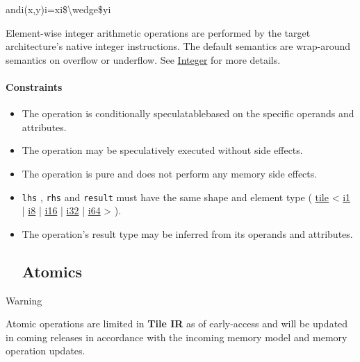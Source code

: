 \documentclass{article}
\begin{document}
andi(x,y)i=xi\$\textbackslash{}wedge\$yi

Element-wise integer arithmetic operations are performed by the target architecture's native integer instructions. The default semantics are wrap-around semantics on overflow or underflow. See \href{https://docs.nvidia.com/cuda/tile-ir/latest/sections/operations.html#op-group-integer}{Integer} for more details.



\paragraph{Constraints}

\begin{itemize}
\item The operation is conditionally speculatablebased on the specific operands and attributes.
\item The operation may be speculatively executed without side effects.
\item The operation is pure and does not perform any memory side effects.
\item \texttt{lhs} , \texttt{rhs} and \texttt{result} must have the same shape and element type ( \href{https://docs.nvidia.com/cuda/tile-ir/latest/sections/types.html#type-tile}{tile} < \href{https://docs.nvidia.com/cuda/tile-ir/latest/sections/types.html#subsection-element-types}{i1} | \href{https://docs.nvidia.com/cuda/tile-ir/latest/sections/types.html#subsection-element-types}{i8} | \href{https://docs.nvidia.com/cuda/tile-ir/latest/sections/types.html#subsection-element-types}{i16} | \href{https://docs.nvidia.com/cuda/tile-ir/latest/sections/types.html#subsection-element-types}{i32} | \href{https://docs.nvidia.com/cuda/tile-ir/latest/sections/types.html#subsection-element-types}{i64} > ).
\item The operation's result type may be inferred from its operands and attributes.



\subsection{Atomics}

\end{itemize}
Warning


Atomic operations are limited in \textbf{Tile IR} as of early-access and will be updated in coming releases in accordance with the incoming memory model and memory operation updates.
\end{document}
